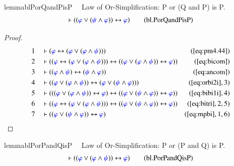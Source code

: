 \begin{restatable}{lemma}{blPorQandPisP}~~ Law of Or-Simplification: P or (Q
and P) is P.
\begin{align}
\vdash ( ( \mw{\varphi} \vee ( \mw{\psi} \wedge \mw{\varphi} ) )
    \leftrightarrow \mw{\varphi} )\label{eq:bl.PorQandPisP}\tag{bl.PorQandPisP}
\end{align}
\end{restatable}

\begin{proof}
\begin{align}
  1 &&  & \vdash ( \mw{\varphi} \leftrightarrow ( \mw{\varphi} \vee (
      \mw{\varphi} \wedge \mw{\psi} ) )
      )&(\mbox{\ref{eq:pm4.44}})\notag
  \\ 2 &&  & \vdash ( ( \mw{\varphi} \leftrightarrow ( \mw{\varphi} \vee (
      \mw{\varphi} \wedge \mw{\psi} ) ) ) \leftrightarrow (
      ( \mw{\varphi} \vee ( \mw{\varphi} \wedge \mw{\psi} )
      ) \leftrightarrow \mw{\varphi} )
      )&(\mbox{\ref{eq:bicom}})\notag
  \\ 3 &&  & \vdash ( ( \mw{\varphi} \wedge \mw{\psi} ) \leftrightarrow (
      \mw{\psi} \wedge \mw{\varphi} )
      )&(\mbox{\ref{eq:ancom}})\notag
  \\ 4 &&  & \vdash ( ( \mw{\varphi} \vee ( \mw{\varphi} \wedge \mw{\psi} ) )
      \leftrightarrow ( \mw{\varphi} \vee ( \mw{\psi}
      \wedge \mw{\varphi} ) )
      )&(\mbox{\ref{eq:orbi2i}},3)\notag
  \\ 5 &&  & \vdash ( ( ( \mw{\varphi} \vee ( \mw{\varphi} \wedge \mw{\psi} ) )
      \leftrightarrow \mw{\varphi} ) \leftrightarrow ( (
      \mw{\varphi} \vee ( \mw{\psi} \wedge \mw{\varphi} ) )
      \leftrightarrow \mw{\varphi} )
      )&(\mbox{\ref{eq:bibi1i}},4)\notag
  \\ 6 &&  & \vdash ( ( \mw{\varphi} \leftrightarrow ( \mw{\varphi} \vee (
      \mw{\varphi} \wedge \mw{\psi} ) ) ) \leftrightarrow (
      ( \mw{\varphi} \vee ( \mw{\psi} \wedge \mw{\varphi} )
      ) \leftrightarrow \mw{\varphi} )
      )&(\mbox{\ref{eq:bitri}},2,5)\notag
  \\ 7 &&  & \vdash ( ( \mw{\varphi} \vee ( \mw{\psi} \wedge \mw{\varphi} ) )
      \leftrightarrow \mw{\varphi}
      )&(\mbox{\ref{eq:mpbi}},1,6)\notag
\end{align}
\end{proof}

\begin{restatable}{lemma}{blPorPandQisP}~~ Law of Or-Simplification: P or (P
and Q) is P.
\begin{align}
\vdash ( ( \mw{\varphi} \vee ( \mw{\varphi} \wedge \mw{\psi} ) )
    \leftrightarrow \mw{\varphi} )\label{eq:bl.PorPandQisP}\tag{bl.PorPandQisP}
\end{align}
\end{restatable}

